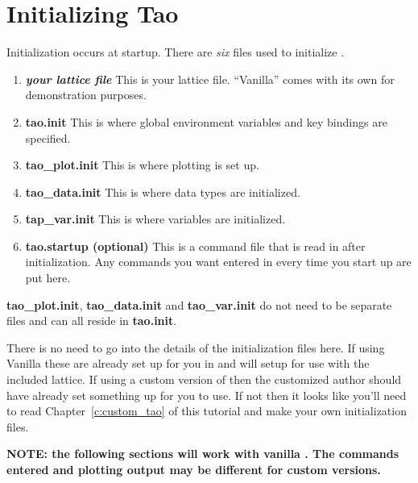 \section{Initializing Tao}
\label{s:initializing}

Initialization occurs at startup. There are \emph{six} files used to
initialize \tao.
  \vspace*{-3ex}
\begin{enumerate}
  \item \textbf{\textit{your lattice file}} \Newline
    This is your lattice file. ``Vanilla'' \tao comes with its own for
demonstration purposes.
  \item \textbf{tao.init} \Newline 
    This is where global environment variables and key bindings are specified.
  \item \textbf{tao\_plot.init} \Newline
    This is where plotting is set up.
  \item \textbf{tao\_data.init} \Newline
    This is where data types are initialized.
  \item \textbf{tap\_var.init} \Newline
    This is where variables are initialized.
  \item \textbf{tao.startup (optional)} \Newline
    This is a command file that is read in after initialization. 
Any commands you
want entered in \tao every time you start up are put here.
\end{enumerate}
\textbf{tao\_plot.init}, \textbf{tao\_data.init} and \textbf{tao\_var.init} do
not need to be separate files and can all reside in \textbf{tao.init}.

There is no need to go into the details of the initialization files
here. If using Vanilla \tao these are already set up for you in
 and will setup \tao for use with the included
\cesr lattice. If using a custom version of \tao then the customized
\tao author should have already set something up for you to use. If
not then it looks like you'll need to read Chapter~\ref{c:custom_tao}
of this tutorial and make your own initialization files.

\textbf{NOTE: the following sections will work with vanilla \tao. The commands
entered and plotting output may be different for custom versions.}

